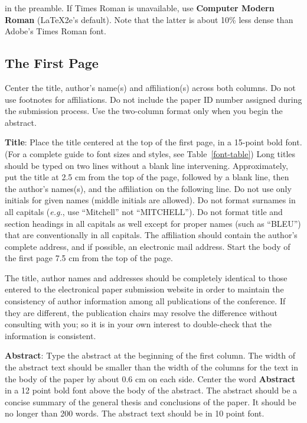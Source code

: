 in the preamble. If Times Roman is unavailable, use {\bf Computer Modern Roman} (\LaTeX2e{}'s default).  Note that the latter is about
  10\% less dense than Adobe's Times Roman font.

\subsection{The First Page}
\label{ssec:first}

Center the title, author's name(s) and affiliation(s) across both columns. Do not use footnotes for affiliations. Do not include the paper ID number assigned during the submission process. Use the two-column format only when you begin the abstract.

{\bf Title}: Place the title centered at the top of the first page, in a 15-point bold font. (For a complete guide to font sizes and styles, see Table~\ref{font-table}) Long titles should be typed on two lines without a blank line intervening. Approximately, put the title at 2.5 cm from the top of the page, followed by a blank line, then the author's names(s), and the affiliation on the following line. Do not use only initials for given names (middle initials are allowed). Do not format surnames in all capitals ({\em e.g.}, use ``Mitchell'' not ``MITCHELL'').  Do not format title and section headings in all capitals as well except for proper names (such as ``BLEU'') that are conventionally in all capitals.  The affiliation should contain the author's complete address, and if possible, an electronic mail address. Start the body of the first page 7.5 cm from the top of the page.

The title, author names and addresses should be completely identical to those entered to the electronical paper submission website in order to maintain the consistency of author information among all publications of the conference. If they are different, the publication chairs may resolve the difference without consulting with you; so it is in your own interest to double-check that the information is consistent.

{\bf Abstract}: Type the abstract at the beginning of the first column. The width of the abstract text should be smaller than the width of the columns for the text in the body of the paper by about 0.6 cm on each side. Center the word {\bf Abstract} in a 12 point bold font above the body of the abstract. The abstract should be a concise summary of the general thesis and conclusions of the paper. It should be no longer than 200 words. The abstract text should be in 10 point font.

